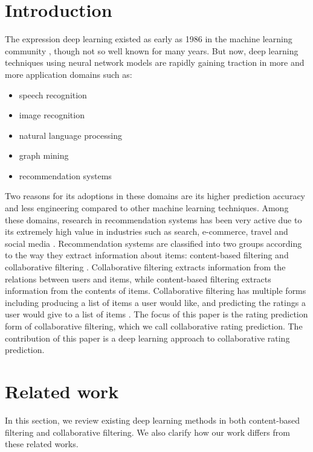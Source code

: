 \documentclass[letterpaper]{article}
\begin{document}
\section{Introduction}
The expression deep learning existed as early as 1986 in the machine learning 
community \cite{dechter1986learning}, though not so well known for many 
years.
But now, deep learning techniques using neural network models are rapidly 
gaining traction in more and more application domains such as:
\begin{itemize}
	\item speech recognition \cite{hannun2014deep}
	\item image recognition \cite{simonyan2014very}
	\item natural language processing \cite{yao2013recurrent}
	\item graph mining \cite{grovernode2vec}
	\item recommendation systems \cite{barkan2016item2vec}
\end{itemize}
Two reasons for its adoptions in these domains are its higher prediction 
accuracy and less engineering compared to other machine learning techniques.
Among these domains, research in recommendation systems has been very active  
due to its extremely high value in industries such as search, e-commerce, 
travel and social media \cite{buettner2016predicting}.
Recommendation systems are classified into two groups according to the way they 
extract information about items: content-based filtering and collaborative 
filtering \cite{ricci2011introduction}.
Collaborative filtering extracts information from the relations between users 
and items, while content-based filtering extracts information from the contents 
of items.
Collaborative filtering has multiple forms including producing a list of items 
a user would like, and predicting the ratings a user would give to a list of 
items \cite{su2009survey}.
The focus of this paper is the rating prediction form of collaborative 
filtering, which we call collaborative rating prediction.
The contribution of this paper is a deep learning approach to collaborative 
rating prediction.

\section{Related work}
In this section,
we review existing deep learning methods in both content-based 
filtering and collaborative filtering.
We also clarify how our work differs from these related works.
\end{document}

